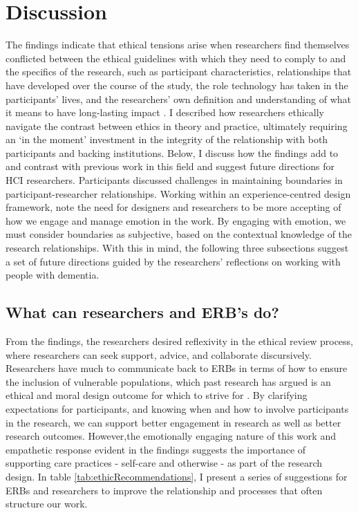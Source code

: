 \section{Discussion}
\label{Ethics:Discussion}
The findings indicate that ethical tensions arise when researchers find themselves conflicted between the ethical guidelines with which they need to comply to and the specifics of the research, such as participant characteristics, relationships that have developed over the course of the study, the role technology has taken in the participants’ lives, and the researchers’ own definition and understanding of what it means to have long-lasting impact \citep{mattsson_praxisrelated_2007}. I described how researchers ethically navigate the contrast between ethics in theory and practice, ultimately requiring an `in the moment' investment in the integrity of the relationship with both participants and backing institutions. Below, I discuss how the findings add to and contrast with previous work in this field and suggest future directions for HCI researchers.
Participants discussed challenges in maintaining boundaries in participant-researcher relationships. Working within an experience-centred design framework, \cite{balaam_emotion_2019} note the need for designers and researchers to be more accepting of how we engage and manage emotion in the work. By engaging with emotion, we must consider boundaries as subjective, based on the contextual knowledge of the research relationships. With this in mind, the following three subsections suggest a set of future directions guided by the researchers' reflections on working with people with dementia.  

\subsection{What can researchers and ERB's do?}
\label{Ethics:WhatCanWeDo}
From the findings, the researchers desired reflexivity in the ethical review process, where researchers can seek support, advice, and collaborate discursively. Researchers have much to communicate back to ERBs in terms of how to ensure the inclusion of vulnerable populations, which past research has argued is an ethical and moral design outcome for which to strive for \citep{scanlon_what_1998}. By clarifying expectations for participants, and knowing when and how to involve participants in the research, we can support better engagement in research as well as better research outcomes. However,the emotionally engaging nature of this work and empathetic response evident in the findings suggests the importance of supporting care practices - self-care and otherwise - as part of the research design. In table \ref{tab:ethicRecommendations}, I present a series of suggestions for ERBs and researchers to improve the relationship and processes that often structure our work.


